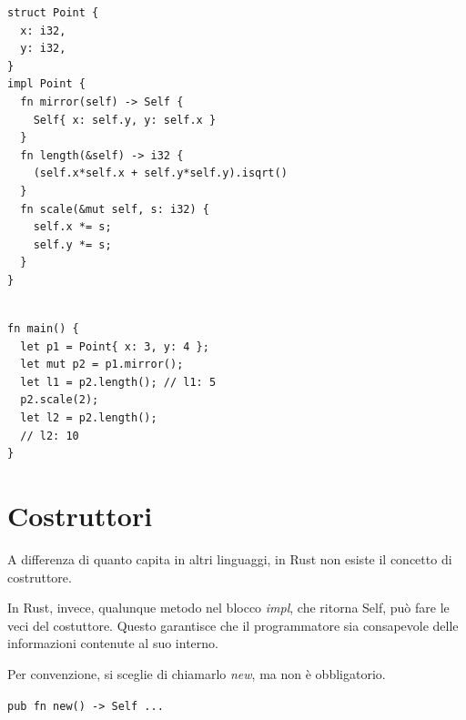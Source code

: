 \begin{center}
  \centering
  \begin{minipage}{\linewidth}
    \begin{minipage}{0.47\linewidth}

      \begin{verbatim}
struct Point {
  x: i32,
  y: i32,
}
impl Point {
  fn mirror(self) -> Self {
    Self{ x: self.y, y: self.x }  
  }
  fn length(&self) -> i32 {
    (self.x*self.x + self.y*self.y).isqrt()
  }
  fn scale(&mut self, s: i32) {
    self.x *= s;
    self.y *= s;
  }
}


\end{verbatim}

    \end{minipage}%
    \hfill
    \begin{minipage}{\linewidth}
      \begin{minipage}{0.47\linewidth}

        \begin{verbatim}
fn main() {
  let p1 = Point{ x: 3, y: 4 };
  let mut p2 = p1.mirror();
  let l1 = p2.length(); // l1: 5
  p2.scale(2);
  let l2 = p2.length();
  // l2: 10
}
\end{verbatim}
      \end{minipage}
    \end{minipage}
  \end{minipage}
\end{center}

\section{Costruttori}

A differenza di quanto capita in altri linguaggi, in Rust non esiste il concetto di
costruttore.

In Rust, invece, qualunque metodo nel blocco \textit{impl}, che ritorna Self, può fare le veci del costuttore.
Questo garantisce che il programmatore sia consapevole delle informazioni contenute al suo interno.


Per convenzione, si sceglie di chiamarlo \textit{new}, ma non è obbligatorio.

\begin{center}
  \centering
  \texttt{pub fn new() -> Self {...}}
\end{center}

